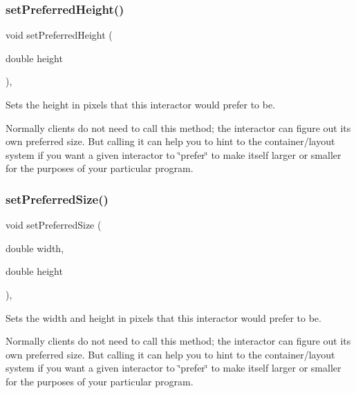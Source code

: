 \mbox{\label{classGInteractor_a1ab987704fce32098706c6f00fb08218}} 
\subsubsection{\texorpdfstring{set\+Preferred\+Height()}{setPreferredHeight()}}
{\footnotesize\ttfamily void set\+Preferred\+Height (\begin{DoxyParamCaption}\item[{double}]{height }\end{DoxyParamCaption})\hspace{0.3cm}{\ttfamily [virtual]}, {\ttfamily [inherited]}}



Sets the height in pixels that this interactor would prefer to be. 

Normally clients do not need to call this method; the interactor can figure out its own preferred size. But calling it can help you to hint to the container/layout system if you want a given interactor to \char`\"{}prefer\char`\"{} to make itself larger or smaller for the purposes of your particular program. \mbox{\label{classGInteractor_a042c5ae19430d765ef552371cae3632c}} 
\subsubsection{\texorpdfstring{set\+Preferred\+Size()}{setPreferredSize()}\hspace{0.1cm}{\footnotesize\ttfamily [1/2]}}
{\footnotesize\ttfamily void set\+Preferred\+Size (\begin{DoxyParamCaption}\item[{double}]{width,  }\item[{double}]{height }\end{DoxyParamCaption})\hspace{0.3cm}{\ttfamily [virtual]}, {\ttfamily [inherited]}}



Sets the width and height in pixels that this interactor would prefer to be. 

Normally clients do not need to call this method; the interactor can figure out its own preferred size. But calling it can help you to hint to the container/layout system if you want a given interactor to \char`\"{}prefer\char`\"{} to make itself larger or smaller for the purposes of your particular program. \mbox{\label{classGInteractor_aa22d9be4bc0e078bb0ea69b0fc9d7c75}} 
